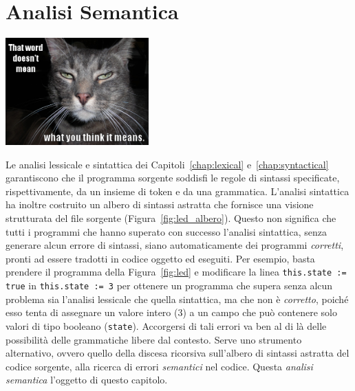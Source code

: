 \chapter{Analisi Semantica}\label{chap:semantical}
%
\vspace*{-2ex}
\begin{center}
\includegraphics[width=5.5cm]{ThinkingCat.png}
\end{center}
%
Le analisi lessicale e sintattica dei Capitoli~\ref{chap:lexical}
e~\ref{chap:syntactical} garantiscono che il programma sorgente
soddisfi le regole di sintassi specificate, rispettivamente,
da un insieme di token e da una grammatica. L'analisi sintattica
ha inoltre costruito un albero di sintassi astratta che fornisce una visione
strutturata del file sorgente (Figura~\ref{fig:led_albero}).
Questo non significa che tutti i programmi che hanno superato con successo
l'analisi sintattica, \cioe senza generare alcun errore di sintassi,
siano automaticamente dei programmi \emph{corretti}, pronti ad essere tradotti
in codice oggetto ed eseguiti. Per esempio, basta prendere il programma
della Figura~\ref{fig:led} e modificare la linea \texttt{this.state := true}
in \texttt{this.state := 3} per ottenere un programma che supera senza alcun
problema sia l'analisi lessicale che quella sintattica, ma che non \`e
\emph{corretto}, poich\'e esso tenta di assegnare un valore intero
($3$) a un campo che pu\`o contenere solo valori di tipo
booleano (\texttt{state}). Accorgersi di tali errori va ben al di l\`a delle
possibilit\`a delle grammatiche libere dal contesto. Serve uno strumento
alternativo, ovvero quello della discesa ricorsiva sull'albero di sintassi
astratta del codice sorgente, alla ricerca di errori \emph{semantici}
nel codice. Questa \emph{analisi semantica} \e l'oggetto di questo capitolo.

